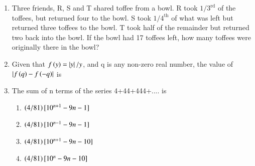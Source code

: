 \documentclass[a4paper, 11pt]{article}
\begin{document}
\begin{enumerate}
    \hfill{}

    \item Three friends, R, S and T shared toffee from a bowl. R took $1/3^{\text{rd}}$ of the toffees, but returned four to the bowl. S took $1/4^{\text{th}}$ of what was left but returned three toffees to the bowl. T took half of the remainder but returned two back into the bowl. If the bowl had 17 toffees left, how many toffees were originally there in the bowl?
    
    \begin{enumerate}
    \end{enumerate}
    
    \hfill{}

    \item Given that $f\left(y\right)=\left\vert y\right\vert/y$, and q is any non-zero real number, the value of $\left\vert f\left(q\right)-f\left(-q\right)\right\vert$ is
    
    \begin{enumerate}
    \end{enumerate}

    \hfill{}

    \item The sum of n terms of the series 4+44+444+.... is
    
    \begin{enumerate}
        \item $\left(4/81\right)[10^{n+1}-9n-1]$
        \item $\left(4/81\right)[10^{n-1}-9n-1]$
        \item $\left(4/81\right)[10^{n+1}-9n-10]$
        \item $\left(4/81\right)[10^{n}-9n-10]$
    \end{enumerate}

    \hfill{}

\end{enumerate}
\end{document}
